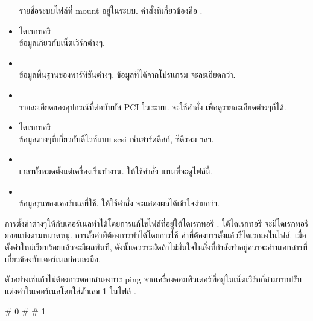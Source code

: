 \begin{thwbr}
\begin{itemize}
รายชื่อระบบไฟล์ที่ mount อยู่ในระบบ. คำสั่งที่เกี่ยวข้องคือ .
\item ไดเรกทอรี \\
ข้อมูลเกี่ยวกับเน็ตเวิร์กต่างๆ. 
\item {}\\
ข้อมูลพื้นฐานของพาร์ทิชันต่างๆ. ข้อมูลที่ได้จากโปรแกรม  จะละเอียดกว่า.
\item {}\\
รายละเอียดของอุปกรณ์ที่ต่อกับบัส PCI ในระบบ. จะใช้คำสั่ง  เพื่อดูรายละเอียดต่างๆก็ได้.
\item ไดเรกทอรี \\
ข้อมูลต่างๆที่เกี่ยวกับดีไวซ์แบบ scsi เช่นฮาร์ดดิสก์, ซีดีรอม ฯลฯ.
\item {}\\
เวลาทั้งหมดตั้งแต่เครื่องเริ่มทำงาน. ให้ใช้คำสั่ง  แทนที่จะดูไฟล์นี้.
\item {}\\
ข้อมูลรุ่นของเคอร์เนลที่ใช้. ให้ใช้คำสั่ง  จะแสดงผลได้เข้าใจง่ายกว่า.
\end{itemize}

การตั้งค่าต่างๆให้กับเคอร์เนลทำได้โดยการแก้ไขไฟล์ที่อยู่ใต้ไดเรกทอรี . ใต้ไดเรกทอรี  จะมีไดเรกทอรีย่อยแบ่งตามหมวดหมู่. การตั้งค่าที่ต้องการทำได้โดยการใช้  ค่าที่ต้องการตั้งแล้วรีไดเรกลงในไฟล์. เมื่อตั้งค่าใหม่เรียบร้อยแล้วจะมีผลทันที, ดังนั้นควรระมัดถ้าไม่มั่นใจในสิ่งที่กำลังทำอยู่ควรจะอ่านเอกสารที่เกี่ยวข้องกับเคอร์เนลก่อนลงมือ.

ตัวอย่างเช่นถ้าไม่ต้องการตอบสนองการ ping จากเครื่องคอมพิวเตอร์ที่อยู่ในเน็ตเวิร์กก็สามารถปรับแต่งค่าในเคอร์เนลโดยใส่ตัวเลข 1 ในไฟล์ . 

\begin{MyExample}
\begin{MyEx}
# 
0
# 
# 
1
\end{MyEx}
\end{MyExample}





\end{thwbr}
